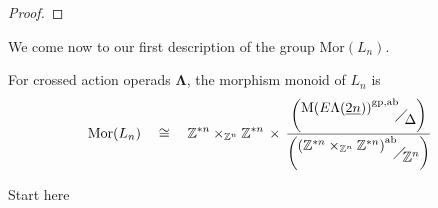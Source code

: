 \documentclass{amsbook} %
\newcommand{\ML}{\mathbf{\Lambda}}
\newcommand{\quotient}[2]{ \raisebox{0.5\height}{$#1$} \mkern-5mu\diagup\mkern-4mu \raisebox{-0.5\height}{$#2$} }
\newcommand{\bigquotient}[2]{ \raisebox{0.75\height}{$#1$} \mkern-12mu\scalebox{2}{$\diagup$}\mkern-10mu \raisebox{-0.5\height}{$#2$} }
\newcommand{\ELnn}{E\Lambda(\underline{2n})}
\numberwithin{section}{chapter}
\begin{document}
\begin{proof}

\end{proof}

We come now to our first description of the group $\mathrm{Mor}(L_n)$.

\begin{prop} \label{Zmor} For crossed action operads $\ML$, the morphism monoid of $L_n$ is 
\[ \mathrm{Mor}(L_n) \quad \cong \quad \mathbb{Z}^{\ast n} \times_{\mathbb{Z}^n} \mathbb{Z}^{\ast n}  \, \times \, \frac{\left(\quotient{{\mathrm{M}(\ELnn)}^{\mathrm{gp},\mathrm{ab}}}{\Delta}\right)}{\left(\quotient{{(\mathbb{Z}^{\ast n} \times_{\mathbb{Z}^n} \mathbb{Z}^{\ast n})}^{\mathrm{ab}}}{\mathbb{Z}^n}\right)} \]
\end{prop}

Start here
\end{document}
